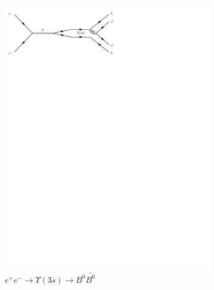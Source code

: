 \begin{figure}[h]
\begin{subfigure}[b]{0.3\textwidth}
    \includegraphics[trim={0.5cm 22cm 10cm 0cm},width=\textwidth]{../Diagrams/D15.pdf}
    \caption{$e^+e^-\rightarrow \Upsilon(3s)\rightarrow B^0\bar{B^0}$}
    \label{fey:15}
  \end{subfigure}
  \newline
  \newline
  \begin{subfigure}[b]{0.3\textwidth}

\end{subfigure}
\end{figure}
